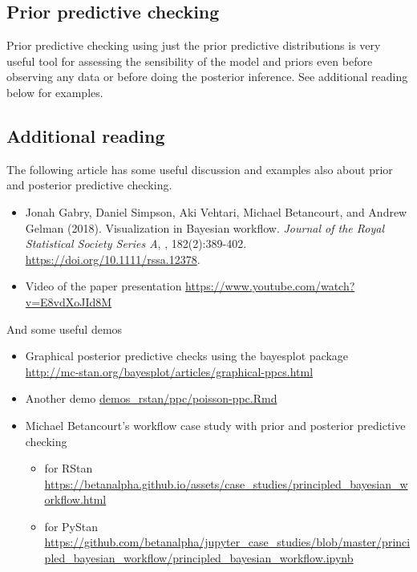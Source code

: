 \documentclass[a4paper,11pt,english]{article}
\begin{document}
 \subsection*{Prior predictive checking}

 Prior predictive checking using just the prior predictive
 distributions is very useful tool for assessing the sensibility of
 the model and priors even before observing any data or before doing
 the posterior inference. See additional reading below for examples.
 
 \subsection*{Additional reading}

The following article has some useful discussion and examples also about prior and posterior predictive checking.
\begin{itemize}
\item  Jonah Gabry, Daniel Simpson, Aki Vehtari, Michael Betancourt, and Andrew Gelman (2018). Visualization in Bayesian workflow. {\em Journal of the Royal Statistical Society Series A}, , 182(2):389-402. \url{https://doi.org/10.1111/rssa.12378}.
\item Video of the paper presentation \url{https://www.youtube.com/watch?v=E8vdXoJId8M}
\end{itemize}

And some useful demos
\begin{itemize}
  \item Graphical posterior predictive checks using the bayesplot package\\
    \url{http://mc-stan.org/bayesplot/articles/graphical-ppcs.html}
  \item Another demo \href{http://avehtari.github.io/BDA_R_demos/demos_rstan/ppc/poisson-ppc.html}{demos\_rstan/ppc/poisson-ppc.Rmd}
  \item Michael Betancourt's workflow case study with prior and posterior predictive checking
    \begin{itemize}
    \item for RStan \url{https://betanalpha.github.io/assets/case_studies/principled_bayesian_workflow.html}
    \item for PyStan \url{https://github.com/betanalpha/jupyter_case_studies/blob/master/principled_bayesian_workflow/principled_bayesian_workflow.ipynb}
    \end{itemize}
  \end{itemize}
\end{document}
